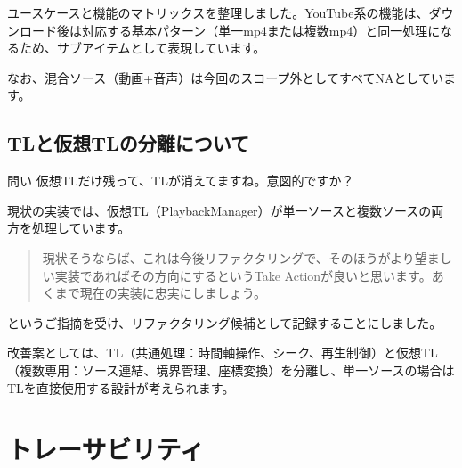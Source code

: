 \documentclass[10pt,a4paper,twocolumn]{ltjsarticle}
\begin{document}
ユースケースと機能のマトリックスを整理しました。YouTube系の機能は、ダウンロード後は対応する基本パターン（単一mp4または複数mp4）と同一処理になるため、サブアイテムとして表現しています。

\vspace{0.5\baselineskip}
\vspace{0.5\baselineskip}

なお、混合ソース（動画+音声）は今回のスコープ外としてすべてNAとしています。

\subsection{TLと仮想TLの分離について}

\begin{itembox}[l]{問い}
仮想TLだけ残って、TLが消えてますね。意図的ですか？
\end{itembox}

現状の実装では、仮想TL（PlaybackManager）が単一ソースと複数ソースの両方を処理しています。

\begin{quote}
現状そうならば、これは今後リファクタリングで、そのほうがより望ましい実装であればその方向にするというTake Actionが良いと思います。あくまで現在の実装に忠実にしましょう。
\end{quote}

というご指摘を受け、リファクタリング候補として記録することにしました。

改善案としては、TL（共通処理：時間軸操作、シーク、再生制御）と仮想TL（複数専用：ソース連結、境界管理、座標変換）を分離し、単一ソースの場合はTLを直接使用する設計が考えられます。

\section{トレーサビリティ}
\end{document}

